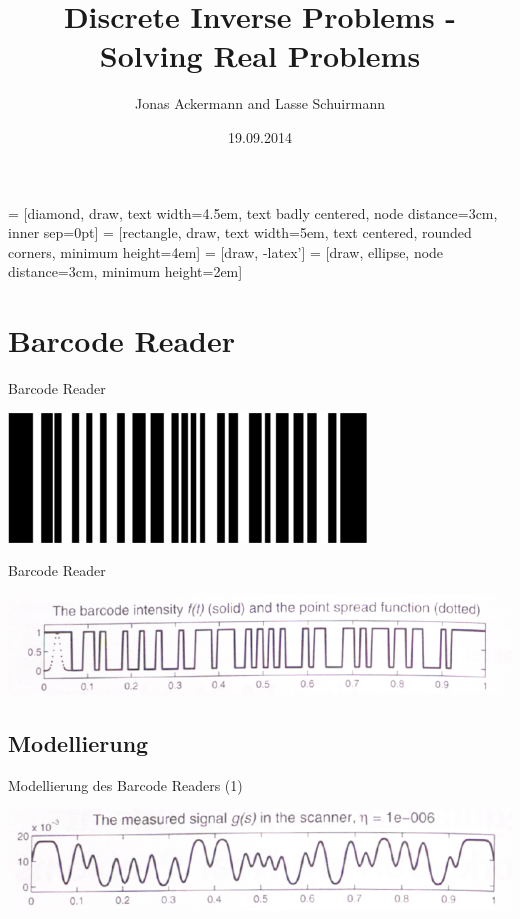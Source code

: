 \documentclass[11pt]{beamer}
\author{Jonas Ackermann and Lasse Schuirmann}
\title{Discrete Inverse Problems - Solving Real Problems}
\date{19.09.2014}
\begin{document}
 = [diamond, draw, 
    text width=4.5em, text badly centered, node distance=3cm, inner sep=0pt]
 = [rectangle, draw, 
    text width=5em, text centered, rounded corners, minimum height=4em]
 = [draw, -latex']
 = [draw, ellipse, node distance=3cm,
    minimum height=2em]

\begin{frame}
\titlepage
\end{frame}


\begin{frame}
\tableofcontents
\end{frame}


\section{Barcode Reader}
\begin{frame}{Barcode Reader}
\begin{center}
\includegraphics[scale=0.5]{Barcode_example.PNG} 
\end{center}
\end{frame}


\begin{frame}{Barcode Reader}
\begin{center}
\includegraphics[scale=0.5]{Barcode_f.PNG} 
\end{center}
\end{frame}


\subsection{Modellierung}
\begin{frame}{Modellierung des Barcode Readers (1)}
\begin{center}
\includegraphics[scale=0.5]{Barcode_g.PNG} 
\end{center}
\end{frame}
\end{document}
